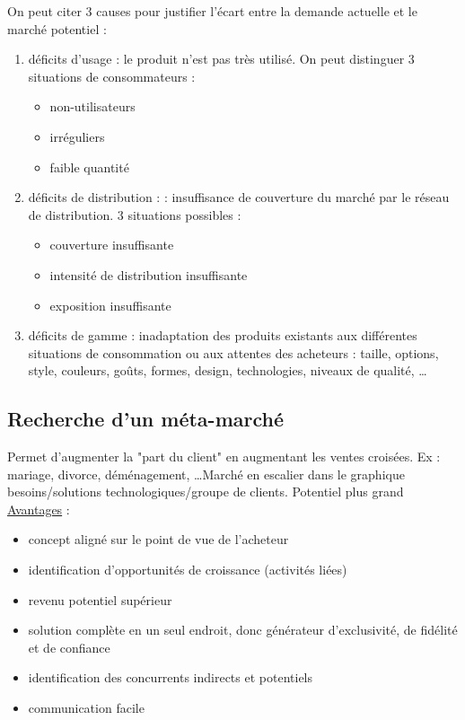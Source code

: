 		On peut citer 3 causes pour justifier l'écart entre la demande actuelle et le marché potentiel :
		\begin{enumerate}
			\item déficits d'usage : le produit n'est pas très utilisé. On peut distinguer 3 situations de consommateurs :
			\begin{itemize}
				\item non-utilisateurs
				\item irréguliers
				\item faible quantité
			\end{itemize}
				
			
			\item déficits de distribution :  
			: insuffisance de couverture du marché par le réseau de distribution. 3 situations possibles : 
			
			\begin{itemize}
				\item couverture insuffisante
				\item intensité de distribution insuffisante
				\item exposition insuffisante
			\end{itemize}
	
		
		\item déficits de gamme : inadaptation des produits existants aux différentes situations de consommation ou aux attentes des acheteurs : taille, options, style, couleurs, goûts, formes, design, technologies, niveaux de qualité, \dots %
		\end{enumerate}
		
		\subsection{Recherche d'un méta-marché}
		
		Permet d'augmenter la "part du client" en augmentant les ventes croisées. Ex : mariage, divorce, déménagement, \dots  Marché en escalier dans le graphique besoins/solutions technologiques/groupe de clients. Potentiel plus grand \\
		
		\underline{Avantages} :
		
		\begin{itemize}
			\item concept aligné sur le point de vue de l'acheteur
			\item identification d'opportunités de croissance (activités liées)
			\item revenu potentiel supérieur
			\item solution complète en un seul endroit, donc générateur d'exclusivité, de fidélité et de confiance
			\item identification des concurrents indirects et potentiels
			\item communication facile
		\end{itemize}
		
